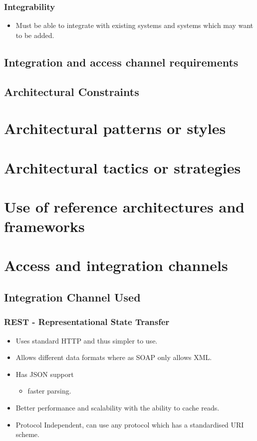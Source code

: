 \documentclass[12pt, oneside]{article}
\begin{document}
		\subsubsection{Integrability}
				\begin{itemize}
					\item Must be able to integrate with existing systems and systems which may want to be added.
				\end{itemize}
				
	\subsection{Integration and access channel requirements}
	\subsection{Architectural Constraints}		

\section{Architectural patterns or styles}
\section{Architectural tactics or strategies}
\section{Use of reference architectures and frameworks}
\newpage
\section{Access and integration channels}
	\subsection{Integration Channel Used}
		\subsubsection{REST - Representational State Transfer}
		\begin{itemize}
			\item Uses standard HTTP and thus simpler to use.
		 	\item Allows different data formats where as SOAP only allows XML.
			\item Has JSON support
				\begin{itemize}
					\item faster parsing.				
				\end{itemize}			 
			\item Better performance and scalability with the ability to cache reads.
			\item Protocol Independent, can use any protocol which has a standardised URI scheme.		
		\end{itemize}
\end{document}
